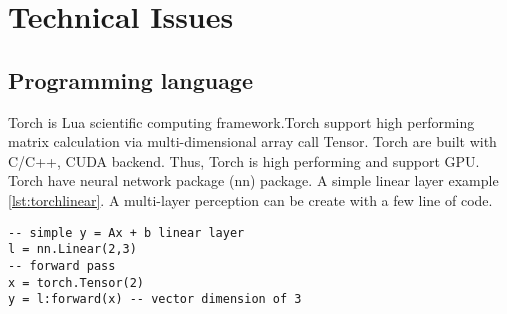 \chapter{Technical Issues}
\section{Programming language}
Torch is Lua scientific computing framework.Torch support high performing matrix calculation via multi-dimensional array call Tensor. Torch are built with C/C++, CUDA backend. Thus, Torch is high performing and support GPU. Torch have neural network package (nn) package. A simple linear layer example \ref{lst:torchlinear}. A multi-layer perception can be create with a few line of code. 


\begin{lstlisting}[caption={Simple linear layer in Torch},label={lst:torchlinear}, language={[5.1]Lua}]
-- simple y = Ax + b linear layer
l = nn.Linear(2,3)
-- forward pass
x = torch.Tensor(2)
y = l:forward(x) -- vector dimension of 3
\end{lstlisting}
